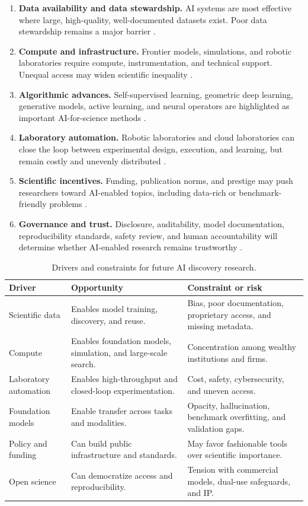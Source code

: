 \documentclass[12pt]{article}
\begin{document}
\begin{enumerate}[leftmargin=*]
    \item \textbf{Data availability and data stewardship.} AI systems are most effective where large, high-quality, well-documented datasets exist. Poor data stewardship remains a major barrier \cite{ref1,ref4}.
    \item \textbf{Compute and infrastructure.} Frontier models, simulations, and robotic laboratories require compute, instrumentation, and technical support. Unequal access may widen scientific inequality \cite{ref2,ref4}.
    \item \textbf{Algorithmic advances.} Self-supervised learning, geometric deep learning, generative models, active learning, and neural operators are highlighted as important AI-for-science methods \cite{ref1}.
    \item \textbf{Laboratory automation.} Robotic laboratories and cloud laboratories can close the loop between experimental design, execution, and learning, but remain costly and unevenly distributed \cite{ref5}.
    \item \textbf{Scientific incentives.} Funding, publication norms, and prestige may push researchers toward AI-enabled topics, including data-rich or benchmark-friendly problems \cite{ref2,ref8}.
    \item \textbf{Governance and trust.} Disclosure, auditability, model documentation, reproducibility standards, safety review, and human accountability will determine whether AI-enabled research remains trustworthy \cite{ref3,ref4,ref8}.
\end{enumerate}

\begin{table}[H]
\centering
\caption{Drivers and constraints for future AI discovery research.}
\small
\begin{tabularx}{\textwidth}{p{3.2cm}X X}
\toprule
\textbf{Driver} & \textbf{Opportunity} & \textbf{Constraint or risk} \\
\midrule
Scientific data & Enables model training, discovery, and reuse. & Bias, poor documentation, proprietary access, and missing metadata. \\
Compute & Enables foundation models, simulation, and large-scale search. & Concentration among wealthy institutions and firms. \\
Laboratory automation & Enables high-throughput and closed-loop experimentation. & Cost, safety, cybersecurity, and uneven access. \\
Foundation models & Enable transfer across tasks and modalities. & Opacity, hallucination, benchmark overfitting, and validation gaps. \\
Policy and funding & Can build public infrastructure and standards. & May favor fashionable tools over scientific importance. \\
Open science & Can democratize access and reproducibility. & Tension with commercial models, dual-use safeguards, and IP. \\
\bottomrule
\end{tabularx}
\end{table}
\end{document}
